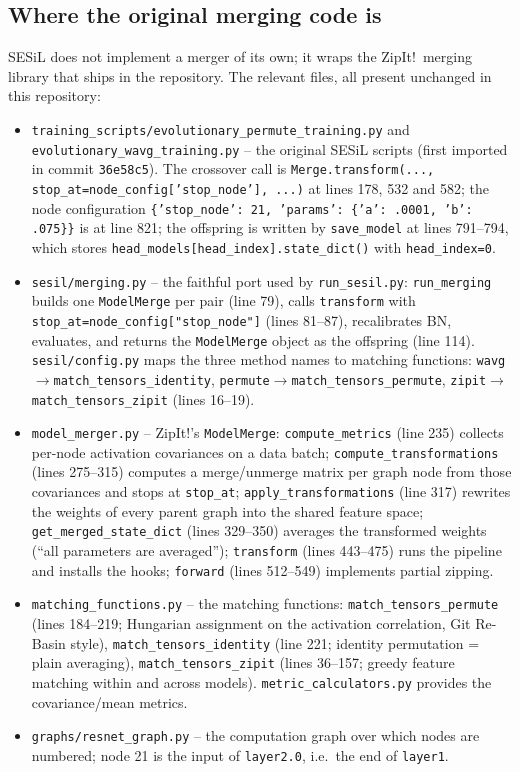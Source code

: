 \documentclass[11pt,a4paper]{article}
\newcommand{\code}[1]{\texttt{#1}}
\begin{document}
\subsection{Where the original merging code is}
SESiL does not implement a merger of its own; it wraps the ZipIt!\ merging library that ships in the repository. The relevant files, all present unchanged in this repository:
\begin{itemize}[nosep]
\item \code{training\_scripts/evolutionary\_permute\_training.py} and \code{evolutionary\_wavg\_training.py} -- the original SESiL scripts (first imported in commit \code{36e58c5}). The crossover call is \code{Merge.transform(..., stop\_at=node\_config['stop\_node'], ...)} at lines 178, 532 and 582; the node configuration \code{\{'stop\_node': 21, 'params': \{'a': .0001, 'b': .075\}\}} is at line 821; the offspring is written by \code{save\_model} at lines 791--794, which stores \code{head\_models[head\_index].state\_dict()} with \code{head\_index=0}.
\item \code{sesil/merging.py} -- the faithful port used by \code{run\_sesil.py}: \code{run\_merging} builds one \code{ModelMerge} per pair (line 79), calls \code{transform} with \code{stop\_at=node\_config["stop\_node"]} (lines 81--87), recalibrates BN, evaluates, and returns the \code{ModelMerge} object as the offspring (line 114). \code{sesil/config.py} maps the three method names to matching functions: \code{wavg}$\to$\code{match\_tensors\_identity}, \code{permute}$\to$\code{match\_tensors\_permute}, \code{zipit}$\to$\code{match\_tensors\_zipit} (lines 16--19).
\item \code{model\_merger.py} -- ZipIt!'s \code{ModelMerge}: \code{compute\_metrics} (line 235) collects per-node activation covariances on a data batch; \code{compute\_transformations} (lines 275--315) computes a merge/unmerge matrix per graph node from those covariances and stops at \code{stop\_at}; \code{apply\_transformations} (line 317) rewrites the weights of every parent graph into the shared feature space; \code{get\_merged\_state\_dict} (lines 329--350) averages the transformed weights (``all parameters are averaged''); \code{transform} (lines 443--475) runs the pipeline and installs the hooks; \code{forward} (lines 512--549) implements partial zipping.
\item \code{matching\_functions.py} -- the matching functions: \code{match\_tensors\_permute} (lines 184--219; Hungarian assignment on the activation correlation, Git Re-Basin style), \code{match\_tensors\_identity} (line 221; identity permutation = plain averaging), \code{match\_tensors\_zipit} (lines 36--157; greedy feature matching within and across models). \code{metric\_calculators.py} provides the covariance/mean metrics.
\item \code{graphs/resnet\_graph.py} -- the computation graph over which nodes are numbered; node 21 is the input of \code{layer2.0}, i.e.\ the end of \code{layer1}.
\end{itemize}
\end{document}
